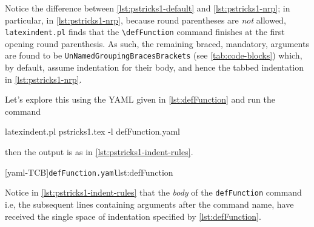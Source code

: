 \documentclass[10pt]{article}
\begin{document}
\begin{example}
 Notice the difference between \cref{lst:pstricks1-default} and \cref{lst:pstricks1-nrp};
 in particular, in \cref{lst:pstricks1-nrp}, because round parentheses are \emph{not}
 allowed, \texttt{latexindent.pl} finds that the \lstinline!\defFunction! command
 finishes at the first opening round parenthesis. As such, the remaining braced,
 mandatory, arguments are found to be \texttt{UnNamedGroupingBracesBrackets} (see
 \vref{tab:code-blocks}) which, by default, assume indentation for their body, and hence
 the tabbed indentation in \cref{lst:pstricks1-nrp}.
 \end{example}

 \begin{example}
 Let's explore this using the YAML given in \cref{lst:defFunction} and run the command

 \begin{commandshell}
latexindent.pl pstricks1.tex -l defFunction.yaml
\end{commandshell}

 then the output is as in \cref{lst:pstricks1-indent-rules}.

 \begin{cmhtcbraster}[raster column skip=.1\linewidth]
  [yaml-TCB]{\texttt{defFunction.yaml}}{lst:defFunction}
 \end{cmhtcbraster}

 Notice in \cref{lst:pstricks1-indent-rules} that the \emph{body} of the
 \lstinline!defFunction! command i.e, the subsequent lines containing arguments after the
 command name, have received the single space of indentation specified by
 \cref{lst:defFunction}.
 \end{example}
\end{document}
